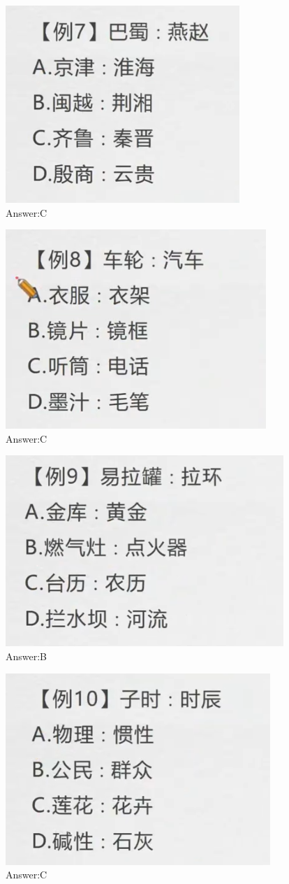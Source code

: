 \documentclass{article}
\numberwithin{equation}{section}						%
\numberwithin{figure}{section}							%
\begin{document}
\begin{sloppypar}
\begin{figure}[H]
     \centering
     \includegraphics[width=0.4\linewidth]{107.png}
		\caption{Answer:C}
\end{figure}


\begin{figure}[H]
     \centering
     \includegraphics[width=0.4\linewidth]{108.png}
		\caption{Answer:C}
\end{figure}


\begin{figure}[H]
     \centering
     \includegraphics[width=0.4\linewidth]{109.png}
		\caption{Answer:B}
\end{figure}


\begin{figure}[H]
     \centering
     \includegraphics[width=0.4\linewidth]{110.png}
		\caption{Answer:C}
\end{figure}



\end{sloppypar}
\end{document}
